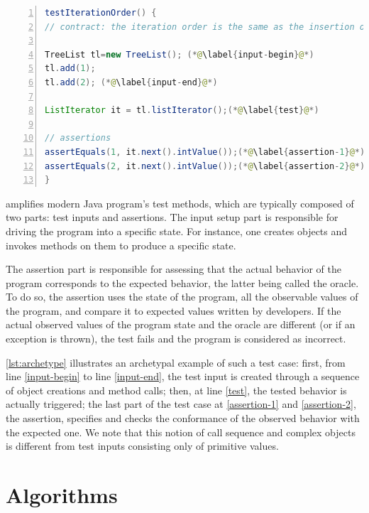 \begin{lstlisting}[caption={An example of an object-oriented test case  (inspired from Apache Commons Collections)},label=lst:archetype,float,language=java,numbers=left] 
testIterationOrder() {
// contract: the iteration order is the same as the insertion order

TreeList tl=new TreeList(); (*@\label{input-begin}@*)
tl.add(1);
tl.add(2); (*@\label{input-end}@*)

ListIterator it = tl.listIterator();(*@\label{test}@*)

// assertions
assertEquals(1, it.next().intValue());(*@\label{assertion-1}@*)
assertEquals(2, it.next().intValue());(*@\label{assertion-2}@*)
}
\end{lstlisting}

\dspot amplifies modern Java program's test methods, which are typically composed of two parts: test inputs and assertions. 
The input setup part is responsible for driving the program into a specific state.
For instance, one creates objects and invokes methods on them to produce a specific state.

The assertion part is responsible for assessing that the actual behavior of the program corresponds to the expected behavior, the latter being called the oracle.
To do so, the assertion uses the state of the program, \ie all the observable values of the program, and compare it to expected values written by developers.
If the actual observed values of the program state and the oracle are different (or if an exception is thrown), the test fails and the program is considered as incorrect.

\autoref{lst:archetype} illustrates an archetypal example of such a test case: 
first, from line \autoref{input-begin} to line \autoref{input-end}, the test input is created through a sequence of object creations and method calls; 
then, at line \autoref{test}, the tested behavior is actually triggered; 
the last part of the test case at \autoref{assertion-1} and \autoref{assertion-2}, the assertion, specifies and checks the conformance of the observed behavior with the expected one.
We note that this notion of call sequence and complex objects is different from test inputs consisting only of primitive values.

\section{Algorithms}

